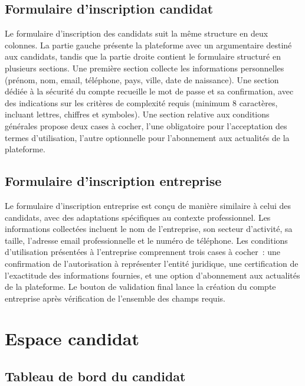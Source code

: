 \documentclass[12pt,a4paper]{report}
\begin{document}
\subsection{Formulaire d'inscription candidat}

Le formulaire d'inscription des candidats suit la même structure en deux colonnes. La partie gauche présente la plateforme avec un argumentaire destiné aux candidats, tandis que la partie droite contient le formulaire structuré en plusieurs sections. Une première section collecte les informations personnelles (prénom, nom, email, téléphone, pays, ville, date de naissance). Une section dédiée à la sécurité du compte recueille le mot de passe et sa confirmation, avec des indications sur les critères de complexité requis (minimum 8 caractères, incluant lettres, chiffres et symboles). Une section relative aux conditions générales propose deux cases à cocher, l'une obligatoire pour l'acceptation des termes d'utilisation, l'autre optionnelle pour l'abonnement aux actualités de la plateforme.

\subsection{Formulaire d'inscription entreprise}

Le formulaire d'inscription entreprise est conçu de manière similaire à celui des candidats, avec des adaptations spécifiques au contexte professionnel. Les informations collectées incluent le nom de l'entreprise, son secteur d'activité, sa taille, l'adresse email professionnelle et le numéro de téléphone. Les conditions d'utilisation présentées à l'entreprise comprennent trois cases à cocher~: une confirmation de l'autorisation à représenter l'entité juridique, une certification de l'exactitude des informations fournies, et une option d'abonnement aux actualités de la plateforme. Le bouton de validation final lance la création du compte entreprise après vérification de l'ensemble des champs requis.

\section{Espace candidat}

\subsection{Tableau de bord du candidat}
\end{document}
